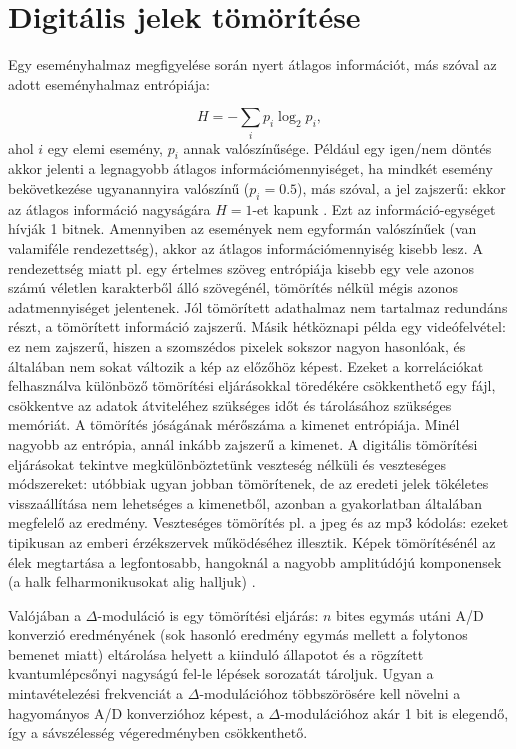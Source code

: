 \documentclass[12pt]{article}
\theoremstyle{plain}
\begin{document}
\section{Digitális jelek tömörítése \cite{Bagoly}}

Egy eseményhalmaz megfigyelése során nyert átlagos információt, más szóval az adott eseményhalmaz entrópiája:

\begin{equation}
	H = - \sum_{i} p_i \log_2 p_i,
\end{equation}
ahol $i$ egy elemi esemény, $p_i$ annak valószínűsége. Például egy igen/nem döntés akkor jelenti a legnagyobb átlagos információmennyiséget, ha mindkét esemény bekövetkezése ugyanannyira valószínű ($p_i = 0.5$), más szóval, a jel zajszerű: ekkor az átlagos információ nagyságára $H = 1$-et kapunk \cite{Bagoly}. Ezt az információ-egységet hívják 1 bitnek. Amennyiben az események nem egyformán valószínűek (van valamiféle rendezettség), akkor az átlagos információmennyiség kisebb lesz. A rendezettség miatt pl. egy értelmes szöveg entrópiája kisebb egy vele azonos számú véletlen karakterből álló szövegénél, tömörítés nélkül mégis azonos adatmennyiséget jelentenek. Jól tömörített adathalmaz nem tartalmaz redundáns részt, a tömörített információ zajszerű. Másik hétköznapi példa egy videófelvétel: ez nem zajszerű, hiszen a szomszédos pixelek sokszor nagyon hasonlóak, és általában nem sokat változik a kép az előzőhöz képest. Ezeket a korrelációkat felhasználva különböző tömörítési eljárásokkal töredékére csökkenthető egy fájl, csökkentve az adatok átviteléhez szükséges időt és tárolásához szükséges memóriát. A tömörítés jóságának mérőszáma a kimenet entrópiája. Minél nagyobb az entrópia, annál inkább zajszerű a kimenet. A digitális tömörítési eljárásokat tekintve megkülönböztetünk veszteség nélküli és veszteséges módszereket: utóbbiak ugyan jobban tömörítenek, de az eredeti jelek tökéletes visszaállítása nem lehetséges a kimenetből, azonban a gyakorlatban általában megfelelő az eredmény. Veszteséges tömörítés pl. a jpeg és az mp3 kódolás: ezeket tipikusan az emberi érzékszervek működéséhez illesztik. Képek tömörítésénél az élek megtartása a legfontosabb, hangoknál a nagyobb amplitúdójú komponensek (a halk felharmonikusokat alig halljuk) \cite{Bagoly}.

Valójában a $\Delta$-moduláció is egy tömörítési eljárás: $n$ bites egymás utáni A/D konverzió eredményének (sok hasonló eredmény egymás mellett a folytonos bemenet miatt) eltárolása helyett a kiinduló állapotot és a rögzített kvantumlépcsőnyi nagyságú fel-le lépések sorozatát tároljuk. Ugyan a mintavételezési frekvenciát a $\Delta$-modulációhoz többszörösére kell növelni a hagyományos A/D konverzióhoz képest, a $\Delta$-modulációhoz akár 1 bit is elegendő, így a sávszélesség végeredményben csökkenthető. 
\end{document}
